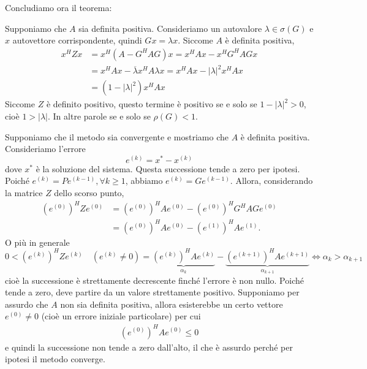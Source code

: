 \documentclass[a4paper]{article}
\begin{document}
\begin{snippetproof}{}
\begin{DispWithArrows*}
    \end{DispWithArrows*}
    Concludiamo ora il teorema:
    \begin{ffiproof}
    \item Supponiamo che \(A\) sia definita positiva.
        Consideriamo un autovalore \(\lambda \in \sigma(G)\) e \(x\)
        autovettore corrispondente, quindi \(Gx = \lambda x\).
        Siccome \(A\) è definita positiva,
        \begin{align*}
            x^H Z x &= x^H(A- G^H A G)x = x^H Ax - x^H G^H A G x \\
            &= x^H A x - \overline{\lambda} x^H A \lambda x = x^H A x - |\lambda|^2 x^H Ax \\
            &= \left(1 - |\lambda|^2\right)x^H A x
        \end{align*}
        Siccome \(Z\) è definito positivo,
        questo termine è positivo se e solo se \(1-|\lambda|^2>0\),
        cioè \(1 > |\lambda|\).
        In altre parole se e solo se \(\rho(G) < 1\).
    \item Supponiamo che il metodo sia convergente e mostriamo che \(A\)
        è definita positiva. Consideriamo l'errore \[
            e^{(k)} = x^\ast - x^{(k)}
        \]
        dove \(x^\ast\) è la soluzione del sistema.
        Questa successione tende a zero per ipotesi.
        Poiché \(e^{(k)} = Pe^{(k-1)}, \forall k \geq 1\), abbiamo
        \(e^{(k)} = Ge^{(k-1)}\). Allora, considerando la matrice \(Z\) dello scorso punto,
        \begin{align*}
            (e^{(0)})^H Z e^{(0)} &= (e^{(0)})^H A e^{(0)}
            -(e^{(0)})^H G^H A Ge^{(0)} \\
            &= (e^{(0)})^H A e^{(0)}-(e^{(1)})^H A e^{(1)}.
        \end{align*}
        O più in generale
        \[
            0 < (e^{(k)})^H Z e^{(k)}\quad(e^{(k)}\neq 0)
            = \underbrace{(e^{(k)})^H A e^{(k)}}_{\alpha_k}
            - \underbrace{(e^{(k+1)})^H A e^{(k+1)}}_{\alpha_{k+1}}
            \iff \alpha_k > \alpha_{k+1}
        \]
        cioè la successione è strettamente decrescente finché l'errore è non nullo. Poiché tende a zero, deve partire da un valore strettamente positivo.
        Supponiamo per assurdo che \(A\) non sia definita positiva, allora esisterebbe
        un certo vettore \(e^{(0)} \neq 0\) (cioè un errore iniziale particolare)
        per cui
        \begin{align*}
            (e^{(0)})^H A e^{(0)} \leq 0
        \end{align*}
        e quindi la successione non tende a zero dall'alto, il che è assurdo perché per ipotesi il metodo converge.
    \end{ffiproof}
\end{snippetproof}
\end{document}
